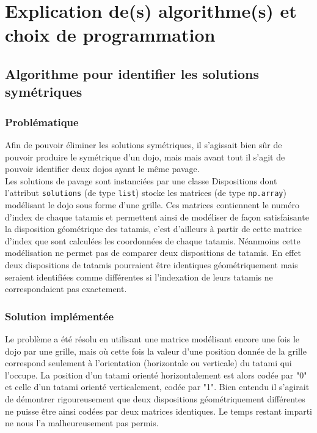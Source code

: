 \section{Explication de(s) algorithme(s) et choix de programmation}

\subsection{Algorithme pour identifier les solutions symétriques}

\subsubsection{Problématique}

Afin de pouvoir éliminer les solutions symétriques, il s’agissait bien sûr de pouvoir produire le symétrique d’un dojo,
mais mais avant tout il s’agit de pouvoir identifier deux dojos ayant le même pavage.\\

Les solutions de pavage sont instanciées par une classe Dispositions dont l’attribut \texttt{solutions}  (de type \texttt{list}) stocke
les matrices (de type \texttt{np.array}) modélisant le dojo sous forme d’une grille. Ces matrices contiennent le numéro d’index de
chaque tatamis et permettent ainsi de modéliser de façon satisfaisante la disposition géométrique des tatamis, c’est d’ailleurs
à partir de cette matrice d’index que sont calculées les coordonnées de chaque tatamis. Néanmoins cette modélisation ne permet
pas de comparer deux dispositions de tatamis. En effet deux dispositions de tatamis pourraient être identiques géométriquement
mais seraient identifiées comme différentes si l’indexation de leurs tatamis ne correspondaient pas exactement.

\subsubsection{Solution implémentée}

Le problème a été résolu en utilisant une matrice modélisant encore une fois le dojo par une grille, mais où cette fois la valeur d’une
position donnée de la grille correspond seulement à l’orientation (horizontale ou verticale) du tatami qui l’occupe.
La position d'un tatami orienté horizontalement est alors codée par "0" et celle d'un tatami orienté verticalement, codée par "1". Bien entendu
il s'agirait de démontrer rigoureusement que deux dispositions géométriquement différentes ne puisse être ainsi codées
par deux matrices identiques. Le temps restant imparti ne nous l'a malheureusement pas permis.\\



